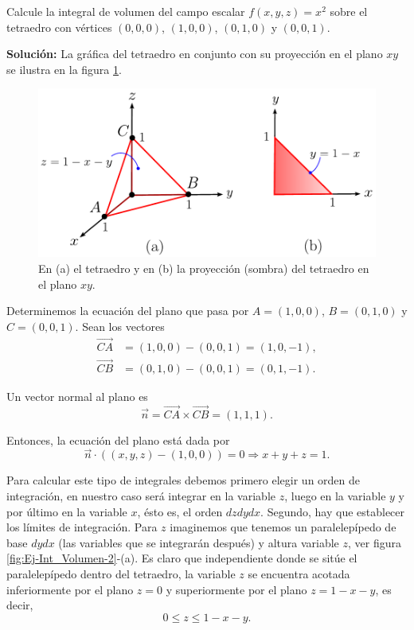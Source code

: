 \begin{ejemplo}
    Calcule la integral de volumen del campo escalar $f(x,y,z) = x^2$ sobre el tetraedro con vértices $(0,0,0)$, $(1,0,0)$, $(0,1,0)$ y $(0,0,1)$.

    \textbf{Solución:} La gráfica del tetraedro en conjunto con su proyección en el plano $xy$ se ilustra en la figura \ref{fig:Ej-Int_Volumen}.

    \begin{figure}[H]
        \centering
        \includegraphics[scale = 0.7]{Figuras/Ej-Integral-Volumen.pdf}
        \caption{En (a) el tetraedro y en (b) la proyección (sombra) del tetraedro en el plano $xy$.}
        \label{fig:Ej-Int_Volumen}
    \end{figure}

    Determinemos la ecuación del plano que pasa por $A = (1,0,0)$, $B = (0,1,0)$ y $C = (0,0,1)$. Sean los vectores
    \begin{align*}
        \overrightarrow{CA} &= (1,0,0) - (0,0,1) = (1,0,-1), \\
        \overrightarrow{CB} &= (0,1,0) - (0,0,1) = (0,1,-1).
    \end{align*}

    Un vector normal al plano es
    $$\Vec{n} = \overrightarrow{CA} \times  \overrightarrow{CB} = (1,1,1).$$

    Entonces, la ecuación del plano está dada por
    $$\Vec{n} \cdot ( (x,y,z) - (1,0,0)) = 0 \Rightarrow x + y + z = 1.$$
    
    Para calcular este tipo de integrales debemos primero elegir un orden de integración, en nuestro caso será integrar en la variable $z$, luego en la variable $y$ y por último en la variable $x$, ésto es, el orden $dzdydx$. Segundo, hay que establecer los límites de integración. Para $z$ imaginemos que tenemos un paralelepípedo de base $dydx$ (las variables que se integrarán después) y altura variable $z$, ver figura \ref{fig:Ej-Int_Volumen-2}-(a). Es claro que independiente donde se sitúe el paralelepípedo dentro del tetraedro, la variable $z$ se encuentra acotada inferiormente por el plano $z = 0$ y superiormente por el plano $z = 1 - x -y$, es decir,
    $$0 \leq z \leq 1-x-y.$$


\end{ejemplo}
